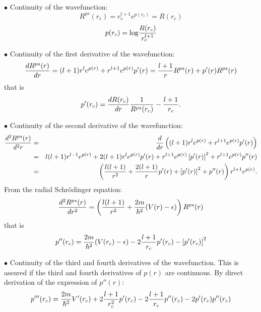 \documentclass[12pt,a4paper]{article}
\begin{document}
\noindent$\bullet$ Continuity of the wavefunction:
\begin{equation}
R^{ps}(r_c)=r_c^{l+1}e^{p(r_c)}=R(r_c)
\end{equation}
\begin{equation}
p(r_c) = \mbox{log}{R(r_c)\over r_c^{l+1}} 
\end{equation}

\noindent$\bullet$ Continuity of the first derivative of the wavefunction:
\begin{equation}
{dR^{ps}(r)\over dr} = (l+1)r^le^{p(r)} + r^{l+1}e^{p(r)}p'(r)
                         ={l+1\over r}R^{ps}(r) + p'(r)R^{ps}(r)
\end{equation}
that is
\begin{equation}
 p'(r_c) = {dR(r_c)\over dr} {1\over R^{ps}(r_c)} -
           {l+1\over r_c}.
\end{equation}

\noindent$\bullet$ Continuity of the second  derivative of the wavefunction:
\begin{eqnarray}
{d^2R^{ps}(r)\over d^2r} 
   & = &
     {d\over dr}\left((l+1)r^le^{p(r)} + r^{l+1}e^{p(r)}p'(r)\right) 
\nonumber \\ & = &
     l(l+1)r^{l-1}e^{p(r)} + 2(l+1)r^le^{p(r)}p'(r) +
     r^{l+1}e^{p(r)}\left[p'(r)\right]^2 + r^{l+1}e^{p(r)}p''(r)
\nonumber\\ & = &
     \left( {l(l+1)\over r^2}+ {2(l+1)\over r}p'(r) +
            \left[p'(r)\right]^2 + p''(r) \right) r^{l+1}e^{p(r)}.
\end{eqnarray}
From the radial Schr\"odinger equation:
\begin{equation}
 {d^2R^{ps}(r)\over dr^2} = 
    \left ( {l(l+1)\over r^2} +{2m\over\hbar^2}(V(r)-\epsilon)\right)R^{ps}(r)
\end{equation}
that is
\begin{equation}
p''(r_c) = {2m\over\hbar^2}(V(r_c)-\epsilon) - 2 {l+1\over r_c}p'(r_c)
         -\left[p'(r_c)\right]^2 
\end{equation}

\noindent$\bullet$ Continuity of the third and fourth derivatives of the
wavefunction. This is assured if the third and fourth derivatives of
$p(r)$ are continuous. By direct derivation of the expression of
$p''(r)$:
\begin{equation}
p'''(r_c) = {2m\over\hbar^2}V'(r_c) + 2 {l+1\over r^2_c}p'(r_c)
          - 2{l+1\over r_c}p''(r_c) -2 p'(r_c)p''(r_c)
\end{equation}
\end{document}
